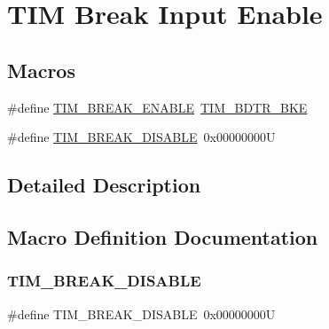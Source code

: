 \hypertarget{group___t_i_m___break___input__enable__disable}{}\section{T\+IM Break Input Enable}
\label{group___t_i_m___break___input__enable__disable}
\subsection*{Macros}
\begin{DoxyCompactItemize}
\item 
\#define \hyperlink{group___t_i_m___break___input__enable__disable_ga3f966247b03532b8d93f9bddc032d863}{T\+I\+M\+\_\+\+B\+R\+E\+A\+K\+\_\+\+E\+N\+A\+B\+LE}~\hyperlink{group___peripheral___registers___bits___definition_ga74250b040dd9fd9c09dcc54cdd6d86d8}{T\+I\+M\+\_\+\+B\+D\+T\+R\+\_\+\+B\+KE}
\item 
\#define \hyperlink{group___t_i_m___break___input__enable__disable_ga8b34ce60f3f08c4b0d924a6546939994}{T\+I\+M\+\_\+\+B\+R\+E\+A\+K\+\_\+\+D\+I\+S\+A\+B\+LE}~0x00000000U
\end{DoxyCompactItemize}


\subsection{Detailed Description}


\subsection{Macro Definition Documentation}
\mbox{\label{group___t_i_m___break___input__enable__disable_ga8b34ce60f3f08c4b0d924a6546939994}} 
\subsubsection{\texorpdfstring{T\+I\+M\+\_\+\+B\+R\+E\+A\+K\+\_\+\+D\+I\+S\+A\+B\+LE}{TIM\_BREAK\_DISABLE}}
{\footnotesize\ttfamily \#define T\+I\+M\+\_\+\+B\+R\+E\+A\+K\+\_\+\+D\+I\+S\+A\+B\+LE~0x00000000U}

